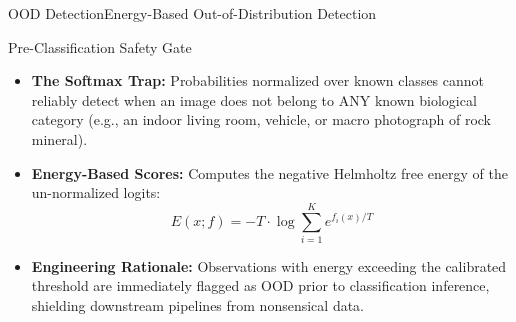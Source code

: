 \begin{frame}{OOD Detection}{Energy-Based Out-of-Distribution Detection}
    \begin{block}{Pre-Classification Safety Gate}
        \begin{itemize}\small
            \item \textbf{The Softmax Trap:} Probabilities normalized over known classes cannot reliably detect when an image does not belong to ANY known biological category (e.g., an indoor living room, vehicle, or macro photograph of rock mineral).
            \item \textbf{Energy-Based Scores:} Computes the negative Helmholtz free energy of the un-normalized logits:
            \[
                E(x; f) = -T \cdot \log \sum_{i=1}^K e^{f_i(x) / T}
            \]
            \item \textbf{Engineering Rationale:} Observations with energy exceeding the calibrated threshold are immediately flagged as OOD prior to classification inference, shielding downstream pipelines from nonsensical data.
        \end{itemize}
    \end{block}


\end{frame}

